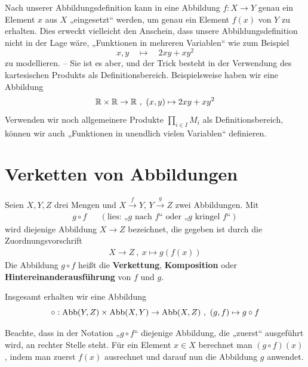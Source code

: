 \begin{bem}
    Nach unserer Abbildungsdefinition kann in eine Abbildung $f:X\to Y$ genau ein Element $x$ aus $X$ „eingesetzt“ werden, um genau ein Element $f(x)$ von $Y$ zu erhalten. Dies erweckt vielleicht den Anschein, dass unsere Abbildungsdefinition nicht in der Lage wäre, „Funktionen in mehreren Variablen“ wie zum Beispiel
        \[ x,y \quad\mapsto\quad 2xy + xy^2 \]
    zu modellieren. -- Sie ist es aber, und der Trick besteht in der Verwendung des kartesischen Produkts als Definitionsbereich. Beispielsweise haben wir eine Abbildung
        \[ \mathbb R \times \mathbb R \to \mathbb R \ ,\ (x,y) \mapsto 2xy +xy^2 \]
    Verwenden wir noch allgemeinere Produkte $\prod_{i\in I} M_i$ als Definitionsbereich, können wir auch „Funktionen in unendlich vielen Variablen“ definieren.
\end{bem}





\section{Verketten von Abbildungen}


\begin{de}\label{def:verkettung} 
    Seien $X,Y,Z$ drei Mengen und $X\xrightarrow{f} Y$, $Y \xrightarrow{g} Z$ zwei Abbildungen. Mit
    \begin{align*}
        g\circ f && (\text{lies: „$g$ nach $f$“ oder „$g$ kringel $f$“})
    \end{align*}
    wird diejenige Abbildung $X\to Z$ bezeichnet, die gegeben ist durch die Zuordnungsvorschrift
    \begin{align*}
        X \to Z \ ,\ x \mapsto g(f(x))
    \end{align*}
    Die Abbildung $g\circ f$ heißt die \textbf{Verkettung}, \textbf{Komposition} oder \textbf{Hintereinanderausführung} von $f$ und $g$.
    
    Insgesamt erhalten wir eine Abbildung
        \[ \circ : \Abb(Y,Z)\times \Abb(X,Y) \to \Abb(X,Z) \ ,\ (g,f) \mapsto g\circ f\]
\end{de}


\begin{bem}
    Beachte, dass in der Notation „$g\circ f$“ diejenige Abbildung, die „zuerst“ ausgeführt wird, an rechter Stelle steht. Für ein Element $x \in X$ berechnet man $(g\circ f)(x)$, indem man zuerst $f(x)$ ausrechnet und darauf nun die Abbildung $g$ anwendet.
\end{bem}


